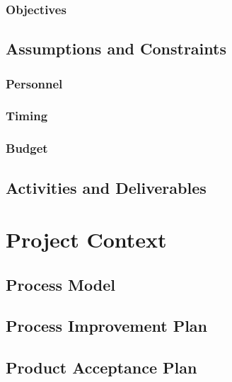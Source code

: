 \documentclass[a4paper, 10pt, oneside]{book}
\begin{document}
\subsection{Objectives}
\lipsum[1]

\section{Assumptions and Constraints} \label{sec:assumptions-and-constraints}
\lipsum[1]

\subsection{Personnel}
\lipsum[1]

\subsection{Timing}
\lipsum[1]

\subsection{Budget} \label{sec:budget}
\lipsum[1]

\section{Activities and Deliverables} \label{sec:activities-and-deliverables}
\lipsum[1]

\chapter{Project Context}
\lipsum[1]

\section{Process Model} \label{sec:process-model}
\lipsum[1]

\section{Process Improvement Plan} \label{sec:process-improvement-plan}
\lipsum[1]

\section{Product Acceptance Plan} \label{sec:product-acceptance-plan}
\lipsum[1]
\end{document}
